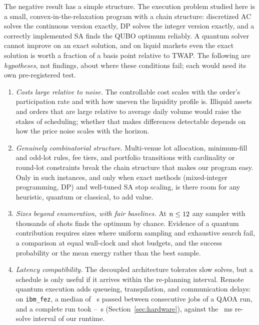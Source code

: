 \documentclass[journal]{IEEEtran}
\begin{document}
The negative result has a simple structure. The execution problem studied here is a small,
convex-in-the-relaxation program with a chain structure: discretized AC solves the continuous
version exactly, DP solves the integer version exactly, and a correctly
implemented SA finds the QUBO optimum reliably. A quantum solver cannot improve on an exact
solution, and on liquid markets even the exact solution is worth a fraction of a basis point
relative to TWAP. The following are \emph{hypotheses}, not findings, about where these
conditions fail; each would need its own pre-registered test.

\begin{enumerate}
\item \emph{Costs large relative to noise.} The controllable cost scales with the order's
  participation rate and with how uneven the liquidity profile is. Illiquid assets and
  orders that are large relative to average daily volume would raise the stakes of
  scheduling; whether that makes differences detectable depends on how the price noise
  scales with the horizon.
\item \emph{Genuinely combinatorial structure.} Multi-venue lot allocation, minimum-fill and
  odd-lot rules, fee tiers, and portfolio transitions with cardinality or round-lot
  constraints break the chain structure that makes our program easy. Only in such instances,
  and only when exact methods (mixed-integer programming, DP) and well-tuned SA stop
  scaling, is there room for any heuristic, quantum or classical, to add value.
\item \emph{Sizes beyond enumeration, with fair baselines.} At $n\le12$ any sampler
  with thousands of shots finds the optimum by chance. Evidence of a quantum contribution
  requires sizes where uniform sampling and exhaustive search fail, a comparison at equal
  wall-clock and shot budgets, and the success probability or the mean energy rather than
  the best sample.
\item \emph{Latency compatibility.} The decoupled architecture tolerates slow solves, but a
  schedule is only useful if it arrives within the re-planning interval. Remote quantum
  execution adds queueing, transpilation, and communication delays: on \texttt{ibm\_fez}, a
  median of \HwJobIntervalMedian~s passed between consecutive jobs of a QAOA run, and a
  complete run took \HwRunSpanMin--\HwRunSpanMax~s (Section~\ref{sec:hardware}), against
  the \OptimizerIntervalMs~ms re-solve interval of our runtime.
\end{enumerate}
\end{document}
